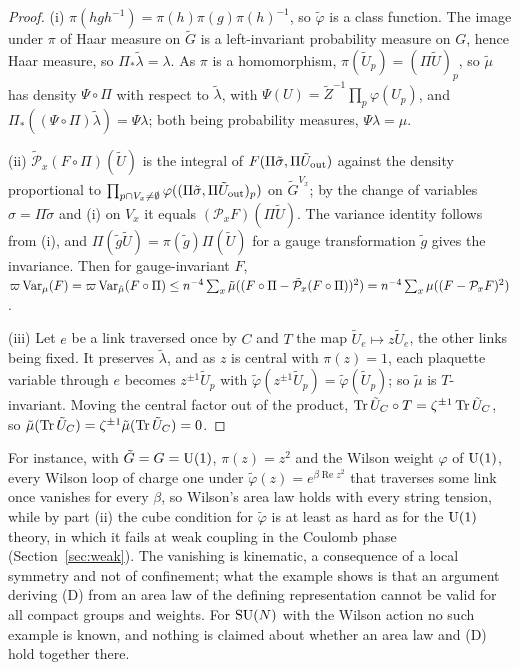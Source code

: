 \begin{proof}
(i) $\pi(hgh^{-1})=\pi(h)\pi(g)\pi(h)^{-1}$, so $\tilde\varphi$ is a class
function. The image under $\pi$ of Haar measure on $\tilde G$ is a
left-invariant probability measure on $G$, hence Haar measure, so
$\Pi_*\tilde\lambda=\lambda$. As $\pi$ is a homomorphism, $\pi(\tilde U_p)=
(\Pi\tilde U)_p$, so $\tilde\mu$ has density $\Psi\circ\Pi$ with respect to
$\tilde\lambda$, with $\Psi(U)=\tilde Z^{-1}\prod_p\varphi(U_p)$, and
$\Pi_*((\Psi\circ\Pi)\tilde\lambda)=\Psi\lambda$; both being probability
measures, $\Psi\lambda=\mu$.

(ii) $\tilde{\mathcal P}_x(F\circ\Pi)(\tilde U)$ is the integral of
$F(\Pi\tilde\sigma,\Pi\tilde U_{\rm out})$ against the density proportional to
$\prod_{p\cap V_x\ne\emptyset}\varphi((\Pi\tilde\sigma,\Pi\tilde U_{\rm
out})_p)$ on $\tilde G^{V_x}$; by the change of variables $\sigma=\Pi\tilde
\sigma$ and (i) on $V_x$ it equals $(\mathcal P_xF)(\Pi\tilde U)$. The variance
identity follows from (i), and $\Pi(\tilde g\tilde U)=\pi(\tilde g)\Pi(\tilde
U)$ for a gauge transformation $\tilde g$ gives the invariance. Then for
gauge-invariant $F$, $\varpi\operatorname{Var}_\mu(F)=\varpi\operatorname{Var}_{\tilde\mu}(F\circ\Pi)\le
n^{-4}\sum_x\tilde\mu((F\circ\Pi-\tilde{\mathcal P}_x(F\circ\Pi))^2)=n^{-4}
\sum_x\mu((F-\mathcal P_xF)^2)$.

(iii) Let $e$ be a link traversed once by $C$ and $T$ the map $\tilde U_e
\mapsto z\tilde U_e$, the other links being fixed. It preserves $\tilde
\lambda$, and as $z$ is central with $\pi(z)=1$, each plaquette variable
through $e$ becomes $z^{\pm1}\tilde U_p$ with $\tilde\varphi(z^{\pm1}\tilde
U_p)=\tilde\varphi(\tilde U_p)$; so $\tilde\mu$ is $T$-invariant. Moving the
central factor out of the product, $\operatorname{Tr}\tilde U_C\circ T=\zeta^{\pm1}\operatorname{Tr}
\tilde U_C$, so $\tilde\mu(\operatorname{Tr}\tilde U_C)=\zeta^{\pm1}\tilde\mu(\operatorname{Tr}\tilde U_C)
=0$.
\end{proof}

For instance, with $\tilde G=G=\mathrm{U}(1)$, $\pi(z)=z^2$ and the Wilson weight
$\varphi$ of $\mathrm{U}(1)$, every Wilson loop of charge one under $\tilde\varphi(z)
=e^{\beta\operatorname{Re}z^2}$ that traverses some link once vanishes for
every $\beta$, so Wilson's area law holds with every string tension, while
by part (ii) the cube condition for $\tilde\varphi$ is at least as hard as for
the $\mathrm{U}(1)$ theory, in which it fails at weak coupling in the Coulomb phase
(Section~\ref{sec:weak}). The vanishing is kinematic, a consequence
of a local symmetry and not of confinement; what the example shows is that
an argument deriving (D) from an area law of the defining representation
cannot be valid for all compact groups and weights. For $\mathrm{SU}(N)$ with the
Wilson action no such example is known, and nothing is claimed about whether
an area law and (D) hold together there.
